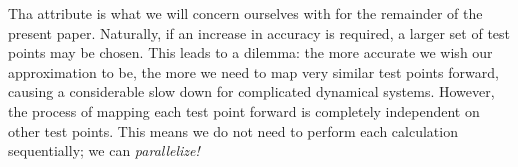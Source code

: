 Tha  attribute is what we will concern ourselves with for the remainder 
of the present paper. Naturally, if an increase in accuracy is required, a larger set of 
test points may be chosen. This leads to a dilemma: the more accurate we wish our 
approximation  to be, the more we need to map very similar test points forward,
causing a considerable slow down for complicated dynamical systems. However, the process of
mapping each test point forward is completely independent on other test points. This means 
we do not need to perform each calculation sequentially; we can \emph{parallelize!}

